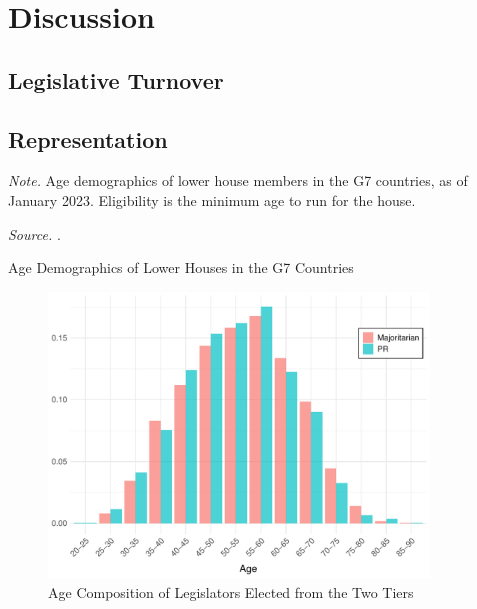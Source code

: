 \documentclass[a4paper, 11pt]{article}
\begin{document}
\section{Discussion} \label{sec: dis}


\subsection{Legislative Turnover}


\subsection{Representation}


\begin{table}[htbp]
\begin{center}
\begin{threeparttable}

\begin{tablenotes}[flushleft]
  \scriptsize{
    \item{\textit{Note.} Age demographics of lower house members in the G7 countries, as of January 2023. Eligibility is the minimum age to run for the house.}
    \item{\textit{Source.} \citet{inter-parliamentaryunionDataAgeCountry2024}.}
  }
\end{tablenotes}
\end{threeparttable}
\caption{Age Demographics of Lower Houses in the G7 Countries}
\label{table:intl}
\end{center}
\end{table}





\begin{figure}[!htbp]
	\includegraphics[width = 0.9\textwidth]{../figure/paper/age_smd_vs_pr_winners.pdf}
	\caption{Age Composition of Legislators Elected from the Two Tiers}
	\label{fig:pr_vs_smd}
\end{figure}
\end{document}
